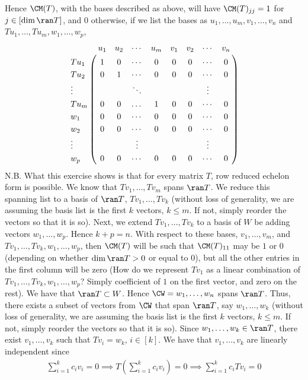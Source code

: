 \documentclass{book}
\begin{document}
\begin{enumerate}[label=\arabic*)]
      Hence $\CM(T)$, with the bases described as above, will have $\CM(T)_{jj} = 1$ for $j \in [\dim\ran T]$, and $0$ otherwise, if we list the bases as $u_1, \dots, u_m, v_1, \dots, v_n$
      and $Tu_1, \dots, Tu_m, w_1, \dots, w_p$,
      \begin{align*}
        \bordermatrix{
          & u_1 & u_2 & \cdots & u_m & v_1 & v_2 & \cdots & v_n \cr
          Tu_1 & 1 & 0 & \cdots & 0 & 0 & 0 & \cdots & 0 \cr
          Tu_2 & 0 & 1 & \cdots & 0 & 0 & 0 & \cdots & 0 \cr
          \vdots & \null & \null & \ddots & \null & \null & \null & \vdots & \null \cr 
          Tu_m & 0 & 0 & \dots & 1 & 0 & 0 & \cdots & 0 \cr
          w_1 & 0 & 0 & \cdots & 0 & 0 & 0 & \cdots & 0 \cr
          w_2 & 0 & 0 & \cdots & 0 & 0 & 0 & \cdots & 0 \cr
          \vdots & \null & \null & \vdots & \null & \null & \null & \vdots & \null \cr 
          w_p & 0 & 0 & \cdots & 0 & 0 & 0 & \cdots & 0 \cr
        }
      \end{align*}
      N.B. What this exercise shows is that for every matrix $T$, row reduced echelon form is possible.
    \ii
      We know that $Tv_1, \dots, Tv_m$ spans $\ran T$. We reduce this spanning list to a basis of $\ran T$, $Tv_1, \dots, Tv_k$ (without loss of generality, we are assuming the basis list is
      the first $k$ vectors, $k \leq m$. If not, simply reorder the vectors so that it is so). Next, we extend $Tv_1, \dots, Tv_k$ to a basis of $W$ be adding vectors $w_1, \dots, w_p$.
      Hence $k + p = n$. With respect to these bases, $v_1, \dots, v_m$, and $Tv_1, \dots, Tv_k, w_1, \dots, w_p$, then $\CM(T)$ will be such that $\CM(T)_{11}$ may be $1$ or $0$ (depending
      on whether $\dim\ran T > 0$ or equal to $0$), but all the other entries in the first column will be zero (How do we represent $Tv_1$ as a linear combination of $Tv_1, \dots, Tv_k, w_1,
      \dots, w_p$? Simply coefficient of $1$ on the first vector, and zero on the rest).
    \ii
      We have that $\ran T \subset W$. Hence $\CW = w_1, \dots, w_n$ spans $\ran T$. Thus, there exists a subset of vectors from $\CW$ that span $\ran T$, say $w_1, \dots, w_k$ (without loss
      of generality, we are assuming the basis list is the first $k$ vectors, $k \leq m$. If not, simply reorder the vectors so that it is so). Since $w_1, \dots, w_k \in \ran T$, there
      exist $v_1, \dots, v_k$ such that $Tv_i = w_k$, $i \in [k]$. We have that $v_1, \dots, v_k$ are linearly independent since
      \begin{align*}
        \sum_{i = 1}^{k}c_iv_i = 0 \implies T(\sum_{i = 1}^{k}c_iv_i) = 0 \implies \sum_{i = 1}^{k}c_iTv_i = 0

\end{align*}
\end{enumerate}
\end{document}
